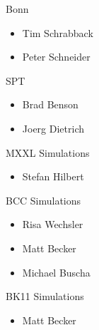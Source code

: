 \documentclass[11pt]{article}
\begin{document}
Bonn
\begin{itemize}
\item Tim Schrabback
\item Peter Schneider
\end{itemize}

SPT
\begin{itemize}
\item Brad Benson
\item Joerg Dietrich
\end{itemize}

MXXL Simulations
\begin{itemize}
\item Stefan Hilbert
\end{itemize}

BCC Simulations
\begin{itemize}
\item Risa Wechsler
\item Matt Becker
\item Michael Buscha
\end{itemize}

BK11 Simulations
\begin{itemize}
\item Matt Becker
\end{itemize}





\end{document}
